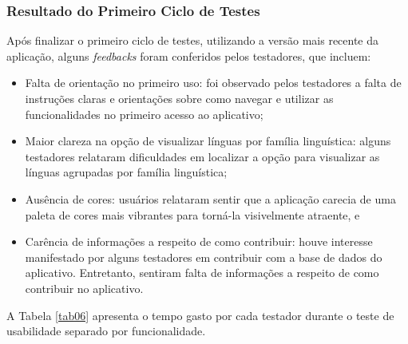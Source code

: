 \subsubsection{Resultado do Primeiro Ciclo de Testes}
\label{sec:Resultado do Primeiro Ciclo de Testes}
Após finalizar o primeiro ciclo de testes, utilizando a versão mais recente da aplicação, alguns \textit{feedbacks} foram conferidos pelos testadores, que incluem:

\begin{itemize}
	\item Falta de orientação no primeiro uso: foi observado pelos testadores a falta de instruções claras e orientações sobre como navegar e utilizar as funcionalidades no primeiro acesso ao aplicativo;
	\item Maior clareza na opção de visualizar línguas por família linguística: alguns testadores relataram dificuldades em localizar a opção para visualizar as línguas agrupadas por família linguística;
	\item Ausência de cores: usuários relataram sentir que a aplicação carecia de uma paleta de cores mais vibrantes para torná-la visivelmente atraente, e
	\item Carência de informações a respeito de como contribuir: houve interesse manifestado por alguns testadores em contribuir com a base de dados do aplicativo. Entretanto, sentiram falta de informações a respeito 
	de como contribuir no aplicativo.
\end{itemize}

A Tabela \ref{tab06} apresenta o tempo gasto por cada testador durante o teste de usabilidade separado por funcionalidade.

